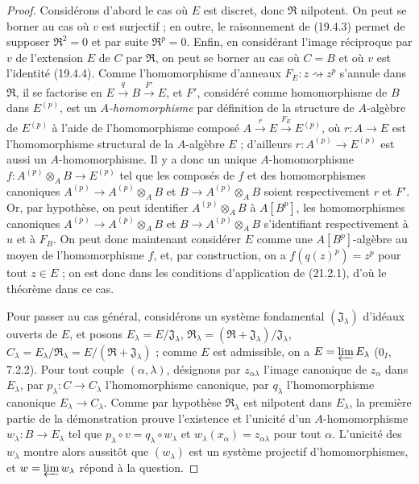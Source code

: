 \begin{proof}
Considérons d'abord le cas où $E$ est discret, donc $\mathfrak R$ nilpotent.
On peut se borner au cas où $v$ est surjectif ; en outre, le raisonnement de
(19.4.3) permet de supposer $\mathfrak R^2=0$ et par suite $\mathfrak R^p=0$.
Enfin, en considérant l'image réciproque par $v$ de l'extension $E$ de $C$
par $\mathfrak R$, on peut se borner au cas où $C=B$ et où $v$ est l'identité
(19.4.4). Comme l'homomorphisme d'anneaux $F_E:z\rightsquigarrow z^p$
s'annule dans $\mathfrak R$, il se factorise en
$E\xrightarrow q B\xrightarrow{F'}E$,
et $F'$, considéré comme homomorphisme de $B$ dans $E^{(p)}$, est un
\emph{$A$-homomorphisme} par définition de la structure de $A$-algèbre de $E^{(p)}$
à l'aide de l'homomorphisme composé
$A\xrightarrow r E\xrightarrow{F_E}E^{(p)}$, où $r:A\to E$ est l'homomorphisme
structural de la $A$-algèbre $E$ ; d'ailleurs
$r:A^{(p)}\to E^{(p)}$ est aussi un $A$-homomorphisme. Il y a donc un unique
$A$-homomorphisme $f:A^{(p)}\otimes_A B\to E^{(p)}$ tel que les composés de $f$
et des homomorphismes canoniques $A^{(p)}\to A^{(p)}\otimes_A B$ et
$B\to A^{(p)}\otimes_A B$ soient respectivement $r$ et $F'$. Or, par hypothèse,
on peut identifier $A^{(p)}\otimes_A B$ à $A[B^p]$, les homomorphismes canoniques
$A^{(p)}\to A^{(p)}\otimes_A B$ et $B\to A^{(p)}\otimes_A B$ s'identifiant
respectivement à $u$ et à $F_B$. On peut donc maintenant considérer $E$ comme
une $A[B^p]$-algèbre au moyen de l'homomorphisme $f$, et, par construction, on a
$f(q(z)^p)=z^p$ pour tout $z\in E$ ; on est donc dans les conditions
d'application de (21.2.1), d'où le théorème dans ce cas.

Pour passer au cas général, considérons un système fondamental
$(\mathfrak J_\lambda)$ d'idéaux ouverts de $E$, et posons
$E_\lambda=E/\mathfrak J_\lambda$,
$\mathfrak R_\lambda=(\mathfrak R+\mathfrak J_\lambda)/\mathfrak J_\lambda$,
$C_\lambda=E_\lambda/\mathfrak R_\lambda=E/(\mathfrak R+\mathfrak J_\lambda)$ ;
comme $E$ est admissible, on a $E=\varprojlim E_\lambda$ (0$_I$, 7.2.2).
Pour tout couple $(\alpha,\lambda)$, désignons par $z_{\alpha\lambda}$
l'image canonique de $z_\alpha$ dans $E_\lambda$, par
$p_\lambda:C\to C_\lambda$ l'homomorphisme canonique,
par $q_\lambda$ l'homomorphisme canonique $E_\lambda\to C_\lambda$.
Comme par hypothèse $\mathfrak R_\lambda$ est nilpotent dans $E_\lambda$,
la première partie de la démonstration prouve l'existence et l'unicité d'un
$A$-homomorphisme $w_\lambda:B\to E_\lambda$ tel que
$p_\lambda\circ v=q_\lambda\circ w_\lambda$ et
$w_\lambda(x_\alpha)=z_{\alpha\lambda}$ pour tout $\alpha$.
L'unicité des $w_\lambda$ montre alors aussitôt que $(w_\lambda)$ est un
système projectif d'homomorphismes, et $w=\varprojlim w_\lambda$ répond
à la question.
\end{proof}

